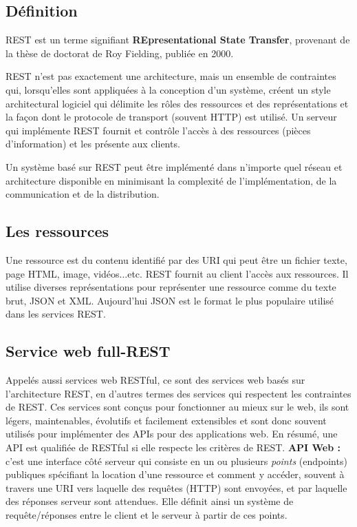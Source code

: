 \subsection{Définition}
REST est un terme signifiant \textbf{REpresentational State Transfer}, provenant de la thèse de doctorat de Roy Fielding, publiée en 2000.

REST n'est pas exactement une architecture, mais un ensemble de contraintes qui, lorsqu'elles sont appliquées à la conception d'un système, créent un style architectural logiciel qui délimite les rôles des ressources et des représentations et la façon dont le protocole de transport (souvent HTTP) est utilisé. 
Un serveur qui implémente REST fournit et contrôle l'accès à des ressources (pièces d'information) et les présente aux clients.
			
Un système basé sur REST peut être implémenté dans n'importe quel réseau et architecture disponible en minimisant la complexité de l'implémentation, de la communication et de la distribution\cite{richardson2008restful}.

\subsection{Les ressources}
Une ressource est du contenu identifié par des URI  qui peut être un fichier texte, page HTML, image, vidéos...etc.
REST fournit au client l'accès aux ressources. Il utilise diverses représentations pour représenter une ressource comme du texte brut, JSON et XML. Aujourd'hui JSON est le format le plus populaire utilisé dans les services REST.

\subsection{Service web full-REST}
Appelés aussi services web RESTful, ce sont des services web basés sur l'architecture REST, en d'autres termes des services qui respectent les contraintes de REST.
Ces services sont conçus pour fonctionner au mieux sur le web, ils sont légers, maintenables, évolutifs et facilement extensibles et sont donc souvent utilisés pour implémenter des APIs pour des applications web.\cite{refTutorialPointsREST}
\newline 
En résumé, une API est qualifiée de RESTful si elle respecte les critères de REST.
\newline
\newline
\textbf{API Web :} c'est une interface côté serveur qui consiste en un ou plusieurs \emph{points} (endpoints) publiques spécifiant la location d'une ressource et comment y accéder, souvent à travers une URI vers laquelle des requêtes (HTTP) sont envoyées, et par laquelle des réponses serveur sont attendues.
Elle définit ainsi un système de requête/réponses entre le client et le serveur à partir de ces points.


